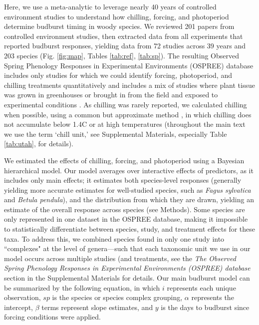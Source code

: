 \documentclass{article}
\begin{document}
\par Here, we use a meta-analytic to leverage nearly 40 years of controlled environment studies to understand how chilling, forcing, and photoperiod determine budburst timing in woody species. We reviewed 201 papers from controlled environment studies, then extracted data from all experiments that reported budburst responses, yielding data from 72 studies across 39 years and 203 species (Fig. \ref{fig:map}, Tables \ref{tab:ref}, \ref{tab:sp}). The resulting Observed Spring Phenology Responses in Experimental Environments (OSPREE) database includes only studies for which we could identify forcing, photoperiod, and chilling treatments quantitatively and includes a mix of studies where plant tissue was grown in greenhouses or brought in from the field and exposed to experimental conditions \citep[Fig. \ref{fig:concept}][]{wolkovich2019}. As chilling was rarely reported, we calculated chilling when possible, using a common but approximate method \emph{\citep{richardson1974}}, in which chilling does not accumulate below 1.4\degree C or at high temperatures (throughout the main text we use the term `chill unit,' see Supplemental Materials, especially Table \ref{tab:utah}, for details). 
\par We estimated the effects of chilling, forcing, and photoperiod using a Bayesian hierarchical model. Our model averages over interactive effects of predictors, as it includes only main effects; it estimates both species-level responses (generally yielding more accurate estimates for well-studied species, such as \emph{Fagus sylvatica} and \emph{Betula pendula}), and the distribution from which they are drawn, yielding an estimate of the overall response across species (see Methods). Some species are only represented in one dataset in the OSPREE database, making it impossible to statistically differentiate between species, study, and treatment effects for these taxa. To address this, we combined species found in only one study into ``complexes" at the level of genera---such that each taxonomic unit we use in our model occurs across multiple studies (and treatments, see the \emph{The Observed Spring Phenology Responses in Experimental Environments (OSPREE) database} section in the Supplemental Materials for details. Our main budburst model can be summarized by the following equation, in which $i$ represents each unique observation, $sp$ is the species or species complex grouping, $\alpha$ represents the intercept, $\beta$ terms represent slope estimates, and $y$ is the days to budburst since forcing conditions were applied.  
\end{document}
